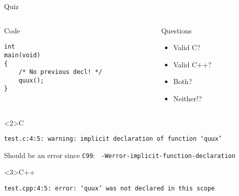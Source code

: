 \documentclass[presentation,aspectratio=169]{beamer}
\begin{document}
\begin{frame}[fragile,label={sec:org23c4234}]{Quiz}
\begin{columns}
\begin{column}{0.48\columnwidth}
\begin{block}{Code}
\begin{verbatim}
int
main(void)
{
    /* No previous decl! */
    quux();
}
\end{verbatim}
\end{block}
\end{column}

\begin{column}{0.48\columnwidth}
\begin{block}{Questions}
\begin{itemize}
\item Valid C?
\item Valid C++?
\item Both?
\item Neither!?
\end{itemize}
\end{block}
\end{column}
\end{columns}

\begin{block}<2>{C}
\begin{verbatim}
test.c:4:5: warning: implicit declaration of function ‘quux’
\end{verbatim}
Should be an error since \texttt{C99}: \texttt{ -Werror-implicit-function-declaration}
\end{block}

\vspace{-2cm}
\begin{block}<3>{C++}
\begin{verbatim}
test.cpp:4:5: error: ‘quux’ was not declared in this scope
\end{verbatim}
\end{block}
\end{frame}

\end{document}
